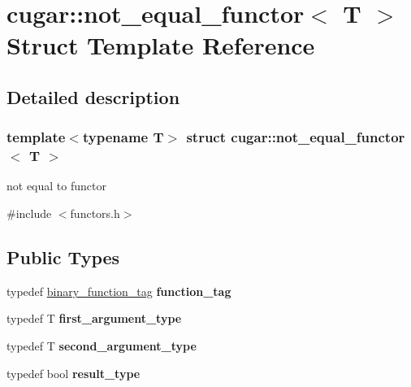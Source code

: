 \hypertarget{structcugar_1_1not__equal__functor}{}\section{cugar\+:\+:not\+\_\+equal\+\_\+functor$<$ T $>$ Struct Template Reference}
\label{structcugar_1_1not__equal__functor}


\subsection{Detailed description}
\subsubsection*{template$<$typename T$>$\newline
struct cugar\+::not\+\_\+equal\+\_\+functor$<$ T $>$}

not equal to functor 

{\ttfamily \#include $<$functors.\+h$>$}

\subsection*{Public Types}
\begin{DoxyCompactItemize}
\item 
\mbox{\label{structcugar_1_1not__equal__functor_a0a6139d247248d093805095a3d45c531}} 
typedef \hyperlink{structcugar_1_1binary__function__tag}{binary\+\_\+function\+\_\+tag} {\bfseries function\+\_\+tag}
\item 
\mbox{\label{structcugar_1_1not__equal__functor_ac7039f934d5792fd60542e2bce2cf09c}} 
typedef T {\bfseries first\+\_\+argument\+\_\+type}
\item 
\mbox{\label{structcugar_1_1not__equal__functor_ac3a4c2fb3934c67f236d0f176ae26ddc}} 
typedef T {\bfseries second\+\_\+argument\+\_\+type}
\item 
\mbox{\label{structcugar_1_1not__equal__functor_acfa184230ce7bc2aa7dedd5f83c4943e}} 
typedef bool {\bfseries result\+\_\+type}
\end{DoxyCompactItemize}
